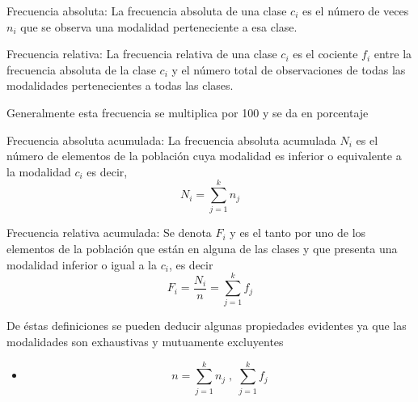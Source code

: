 \begin{definition}
Frecuencia absoluta: La frecuencia absoluta de una clase $c_{i}$ es el
n\'{u}mero de veces $n_{i}$ que se observa una modalidad perteneciente a esa clase.
\end{definition}

\begin{definition}
Frecuencia relativa: La frecuencia relativa de una clase $c_{i}$ es el
cociente $f_{i}$ entre la frecuencia absoluta de la clase $c_{i}$ y el
n\'{u}mero total de observaciones de todas las modalidades pertenecientes a
todas las clases.
\end{definition}

Generalmente esta frecuencia se multiplica por 100 y se da en porcentaje

\begin{definition}
Frecuencia absoluta acumulada: La frecuencia absoluta acumulada $N_{i}$ es el
n\'{u}mero de elementos de la poblaci\'{o}n cuya modalidad es inferior o
equivalente a la modalidad $c_{i}$ es decir,
\[
N_{i}=\sum_{j=1}^{k}n_{j}%
\]

\end{definition}

\begin{definition}
Frecuencia relativa acumulada: Se denota $F_{i}$ y es el tanto por uno de los
elementos de la poblaci\'{o}n que est\'{a}n en alguna de las clases y que
presenta una modalidad inferior o igual a la $c_{i}$, es decir
\[
F_{i}=\frac{N_{i}}{n}=\sum_{j=1}^{k}f_{j}
\]

\end{definition}

De \'{e}stas definiciones se pueden deducir algunas propiedades evi\-dentes ya
que las modalidades son exhaustivas y mutuamente excluyentes

\begin{itemize}
\item
\[
n=\sum_{j=1}^{k}n_{j}\;,\;\sum_{j=1}^{k}f_{j}%
\]

\end{itemize}



